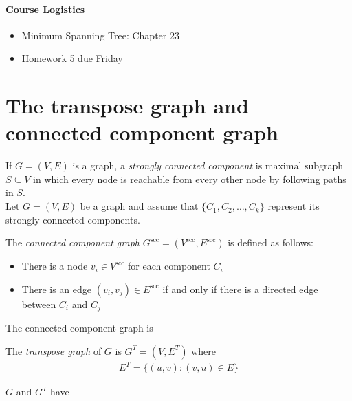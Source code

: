 \documentclass[11  pt]{exam}
\begin{document}
	
	
	\paragraph{Course Logistics}
	
	\begin{itemize}
		\item Minimum Spanning Tree: Chapter 23
		\item Homework 5 due Friday
	\end{itemize}
	
	\section{The transpose graph and connected component graph}
	If $G = (V,E)$ is a graph, a \emph{strongly connected component} is maximal subgraph $S \subseteq V$ in which every node is reachable from every other node by following paths in $S$. \\
	
	Let $G = (V,E)$ be a graph and assume that $\{C_1, C_2, \hdots , C_k\}$ represent its strongly connected components. 
	
	The \emph{connected component graph} $G^\text{scc} = (V^\text{scc}, E^\text{scc})$ is defined as follows:
	\begin{itemize}
		\item There is a node $v_i \in V^{\text{scc}}$ for each component $C_i$
		\item There is an edge $(v_i, v_j) \in E^{\text{scc}}$ if and only if there is a directed edge between $C_i$ and $C_j$
	\end{itemize}
	\begin{lemma}
		The connected component graph is 
	\end{lemma}
	
	\vs{5cm}
	
	The \emph{transpose graph} of $G$ is $G^T = (V, E^T)$ where
	\begin{align*}
		E^T = \{ (u,v) \colon (v,u) \in E\}
	\end{align*}
	
	\begin{lemma}
		$G$ and $G^T$ have \hide{the same strongly }
	\end{lemma}
	
	\newpage
	
	
	
	
	
\end{document}
